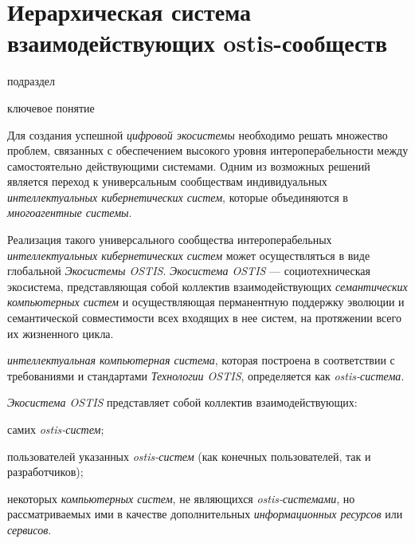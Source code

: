 \section{Иерархическая система взаимодействующих ostis-сообществ}
{\label{sec_ecosystem_structure}} 

\begin{SCn}

\begin{scnrelfromlist}{подраздел}
\end{scnrelfromlist}

\begin{scnrelfromlist}{ключевое понятие}
\end{scnrelfromlist}


\end{SCn}

Для создания успешной \textit{цифровой экосистемы} необходимо решать множество проблем, связанных с обеспечением высокого уровня интероперабельности между самостоятельно действующими системами. Одним из возможных решений является переход к универсальным сообществам индивидуальных \textit{интеллектуальных кибернетических систем}, которые объединяются в \textit{многоагентные системы}.

Реализация такого универсального сообщества интероперабельных \textit{интеллектуальных кибернетических систем} может осуществляться в виде глобальной \textit{Экосистемы OSTIS}. 
\textit{Экосистема OSTIS} --- социотехническая экосистема, представляющая собой коллектив взаимодействующих \textit{семантических компьютерных систем} и осуществляющая перманентную поддержку эволюции и семантической совместимости всех входящих в нее систем, на протяжении всего их жизненного цикла. 

\textit{интеллектуальная компьютерная система}, которая построена в соответствии с требованиями и стандартами \textit{Технологии OSTIS}, определяется как \textit{ostis-система}. 

\textit{Экосистема OSTIS} представляет собой коллектив взаимодействующих:
\begin{textitemize}
    \item самих \textit{ostis-систем};
    \item пользователей указанных \textit{ostis-систем} (как конечных пользователей, так и разработчиков);
    \item некоторых \textit{компьютерных систем}, не являющихся \textit{ostis-системами}, но рассматриваемых ими в качестве дополнительных \textit{информационных ресурсов} или \textit{сервисов}.
\end{textitemize}

